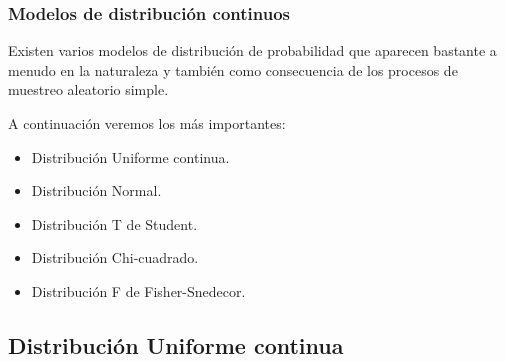 \begin{frame}
\frametitle{Modelos de distribución continuos}
Existen varios modelos de distribución de probabilidad que aparecen bastante a menudo en la naturaleza y también como consecuencia de los
procesos de muestreo aleatorio simple.

A continuación veremos los más importantes:
\begin{itemize}
\item Distribución Uniforme continua.
\item Distribución Normal.
\item Distribución T de Student.
\item Distribución Chi-cuadrado.
\item Distribución F de Fisher-Snedecor.
\end{itemize}

\end{frame}


\subsection{Distribución Uniforme continua}

